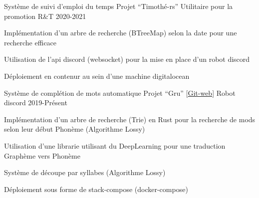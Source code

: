 \begin{cventries}
  \cventry
    {Système de suivi d'emploi du temps}
    {Projet ``Timothé-rs'' \href{https://github.com/MatthieuCoder/Timothe-rs.git}{\faGithubSquare}}
    {Utilitaire pour la promotion R\&T}
    {2020-2021}
    {
      \vspace{-0.33cm}
      \begin{cvitems}
        \item {Implémentation d'un arbre de recherche (BTreeMap) selon la date pour une recherche efficace} 
        \item {Utilisation de l'api discord (websocket) pour la mise en place d'un robot discord}
        \item {Déploiement en contenur au sein d'une machine digitalocean}
      \end{cvitems}
    }
  \cventry
    {Système de complétion de mots automatique}
    {Projet ``Gru'' [\href{https://git.puffer.fish/?p=matthieu/gru.git;a=summary}{Git-web}]}
    {Robot discord}
    {2019-Présent}
    {
      \vspace{-0.33cm}
      \begin{cvitems}
        \item {Implémentation d'un arbre de recherche (Trie) en Rust pour la recherche de mods selon leur début Phonème (Algorithme Lossy)} 
        \item {Utilisation d'une librarie utilisant du DeepLearning pour une traduction Graphème vers Phonème}
        \item {Système de découpe par syllabes (Algorithme Lossy)}
        \item {Déploiement sous forme de stack-compose (docker-compose)}
      \end{cvitems}
    }
\end{cventries}
